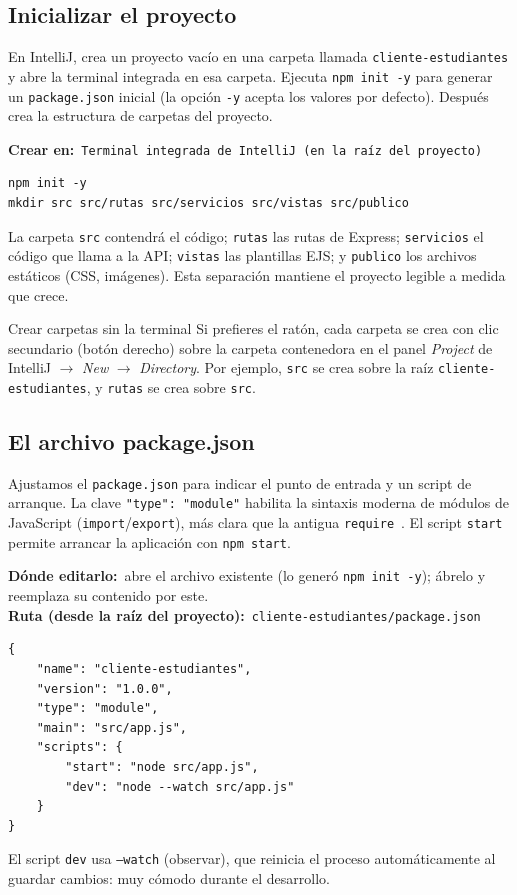 \documentclass[11pt]{article}
\newcommand{\crearen}[1]{{\small\color{ndverdeo}\textbf{Crear en:}~}\texttt{#1}\par\nobreak\vspace{-1pt}}
\newcommand{\editaren}[2]{\begin{ubic}{\footnotesize\textbf{\color{ndverdeo}D\'onde editarlo:}~abre el archivo existente #1.\\[2pt]\textbf{\color{ndverdeo}Ruta (desde la ra\'iz del proyecto):}~\texttt{#2}}\end{ubic}\nobreak\vspace{3pt}}
\begin{document}
\subsection{Inicializar el proyecto}
En IntelliJ, crea un proyecto vacío en una carpeta llamada \texttt{cliente-\allowbreak{}estudiantes} y abre la terminal integrada en esa carpeta. Ejecuta \texttt{npm init -y} para generar un \texttt{package.\allowbreak{}json} inicial (la opción \texttt{-y} acepta los valores por defecto). Después crea la estructura de carpetas del proyecto.

\crearen{Terminal integrada de IntelliJ (en la raíz del proyecto)}
\begin{cajacodigo}
\begin{lstlisting}[style=bash]
npm init -y
mkdir src src/rutas src/servicios src/vistas src/publico
\end{lstlisting}
\end{cajacodigo}
\vspace{2pt}
La carpeta \texttt{src} contendrá el código; \texttt{rutas} las rutas de Express; \texttt{servicios} el código que llama a la API; \texttt{vistas} las plantillas EJS; y \texttt{publico} los archivos estáticos (CSS, imágenes). Esta separación mantiene el proyecto legible a medida que crece.

\begin{cajatip}{Crear carpetas sin la terminal}
Si prefieres el ratón, cada carpeta se crea con clic secundario (botón derecho) sobre la carpeta contenedora en el panel \emph{Project} de IntelliJ $\rightarrow$ \emph{New} $\rightarrow$ \emph{Directory}. Por ejemplo, \texttt{src} se crea sobre la raíz \texttt{cliente-estudiantes}, y \texttt{rutas} se crea sobre \texttt{src}.\par
\end{cajatip}

\subsection{El archivo package.json}
Ajustamos el \texttt{package.\allowbreak{}json} para indicar el punto de entrada y un script de arranque. La clave \texttt{"type": "module"} habilita la sintaxis moderna de módulos de JavaScript (\texttt{import}/\texttt{export}), más clara que la antigua \texttt{require}~\citep{casciaro2020node}. El script \texttt{start} permite arrancar la aplicación con \texttt{npm start}.

\editaren{(lo generó \texttt{npm init -y}); ábrelo y reemplaza su contenido por este}{cliente-estudiantes/package.json}
\begin{cajacodigo}
\begin{lstlisting}[style=json]
{
	"name": "cliente-estudiantes",
	"version": "1.0.0",
	"type": "module",
	"main": "src/app.js",
	"scripts": {
		"start": "node src/app.js",
		"dev": "node --watch src/app.js"
	}
}
\end{lstlisting}
\end{cajacodigo}
\vspace{2pt}
El script \texttt{dev} usa \texttt{--watch} (observar), que reinicia el proceso automáticamente al guardar cambios: muy cómodo durante el desarrollo.
\end{document}
